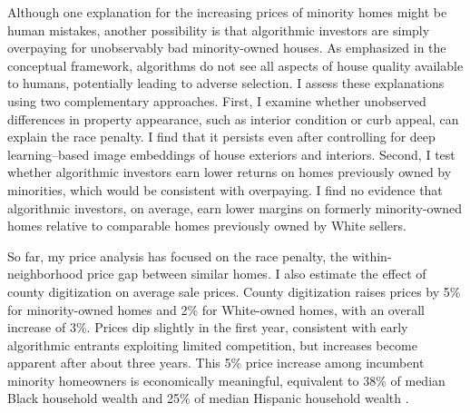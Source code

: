 \documentclass[11pt]{article}
\begin{document}
Although one explanation for the increasing prices of minority homes might be human mistakes, another possibility is that algorithmic investors are simply overpaying for unobservably bad minority-owned houses. As emphasized in the conceptual framework, algorithms do not see all aspects of house quality available to humans, potentially leading to adverse selection. I assess these explanations using two complementary approaches. First, I examine whether unobserved differences in property appearance, such as interior condition or curb appeal, can explain the race penalty. I find that it persists even after controlling for deep learning–based image embeddings of house exteriors and interiors. Second, I test whether algorithmic investors earn lower returns on homes previously owned by minorities, which would be consistent with overpaying. I find no evidence that algorithmic investors, on average, earn lower margins on formerly minority-owned homes relative to comparable homes previously owned by White sellers. 
 
So far, my price analysis has focused on the race penalty, the within-neighborhood price gap between similar homes. I also estimate the effect of county digitization on average sale prices. County digitization raises prices by 5\% for minority-owned homes and 2\% for White-owned homes, with an overall increase of 3\%. Prices dip slightly in the first year, consistent with early algorithmic entrants exploiting limited competition, but increases become apparent after about three years. This 5\% price increase among incumbent minority homeowners is economically meaningful, equivalent to 38\% of median Black household wealth and 25\% of median Hispanic household wealth \citep{bhuttaDisparitiesWealthRace2020}.



\end{document}
